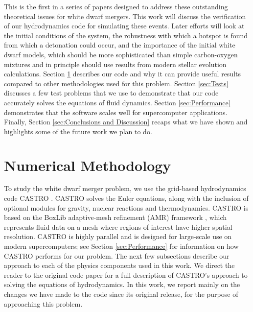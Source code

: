 \documentclass[12pt,preprint]{aastex}
\begin{document}
This is the first in a series of papers designed to address these outstanding theoretical issues for white dwarf mergers. This work will discuss the verification of our hydrodynamics code for simulating these events. Later efforts will look at the initial conditions of the system, the robustness with which a hotspot is found from which a detonation could occur, and the importance of the initial white dwarf models, which should be more sophisticated than simple carbon-oxygen mixtures and in principle should use results from modern stellar evolution calculations. Section \ref{sec:Numerical Methodology} describes our code and why it can provide useful results compared to other methodologies used for this problem. Section \ref{sec:Tests} discusses a few test problems that we use to demonstrate that our code accurately solves the equations of fluid dynamics. Section \ref{sec:Performance} demonstrates that the software scales well for supercomputer applications. Finally, Section \ref{sec:Conclusions and Discussion} recaps what we have shown and highlights some of the future work we plan to do.

\section{Numerical Methodology}\label{sec:Numerical Methodology}

To study the white dwarf merger problem, we use the grid-based hydrodynamics code CASTRO \citep{castro}. CASTRO solves the Euler equations, along with the inclusion of optional modules for gravity, nuclear reactions and thermodynamics. CASTRO is based on the BoxLib adaptive-mesh refinement (AMR) framework \citep{rendleman:2000}, which represents fluid data on a mesh where regions of interest have higher spatial resolution. CASTRO is highly parallel and is designed for large-scale use on modern supercomputers; see Section \ref{sec:Performance} for information on how CASTRO performs for our problem. The next few subsections describe our approach to each of the physics components used in this work. We direct the reader to the original code paper for a full description of CASTRO's approach to solving the equations of hydrodynamics. In this work, we report mainly on the changes we have made to the code since its original release, for the purpose of approaching this problem. 
\end{document}
